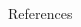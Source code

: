 \documentclass[t, final]{beamer}
\begin{document}
\begin{frame}{}
\begin{columns}[t]
\begin{column}{.32\linewidth}
\begin{block}{References}
  \renewcommand*{\bibfont}{\footnotesize}
  \printbibliography
\end{block}

\end{column}
\end{columns}

\end{frame}
\end{document}

